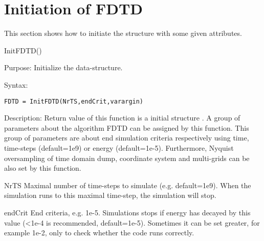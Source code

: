 \section{Initiation of FDTD} \label{sec:FDTD_ATTRIBUTE}
 \label{para:FDTD_ATTRIBUTE}
This section shows how to initiate the structure  with some given attributes.
 
\begin{FontNameFunct}{InitFDTD()}
 \label{func:InitFDTD} 
\end{FontNameFunct}

\begin{FontDescr}{Purpose:}
Initialize the  data-structure.
\end{FontDescr}

\begin{FontDescr}{Syntax:}
      \begin{lstlisting}
FDTD = InitFDTD(NrTS,endCrit,varargin)
      \end{lstlisting}
\end{FontDescr}

\begin{FontDescr}{Description:}
Return value of this function is a initial structure  . A group of parameters about the algorithm FDTD can be assigned by this function. This group of parameters are about end  simulation criteria respectively  using time, time-steps (default=1e9) or energy (default=1e-5). Furthermore, Nyquist oversampling of time domain dump, coordinate system and multi-grids \cite{EC_FDTD_CYL_THORSTEN} can be also set by this function.
    \begin{FontPara}{NrTS}  \label{para:NrTS}
    Maximal number of time-steps to simulate (e.g. default=1e9). When the simulation runs to this maximal time-step, the simulation will stop.
    \end{FontPara}
    \begin{FontPara}{endCrit}  \label{para:endCrit}
    End criteria, e.g. 1e-5. Simulations stops if energy has decayed by this value (<1e-4 is recommended, default=1e-5). Sometimes it can be set greater, for example 1e-2, only to check whether the code runs correctly.
    \end{FontPara}
\end{FontDescr}

